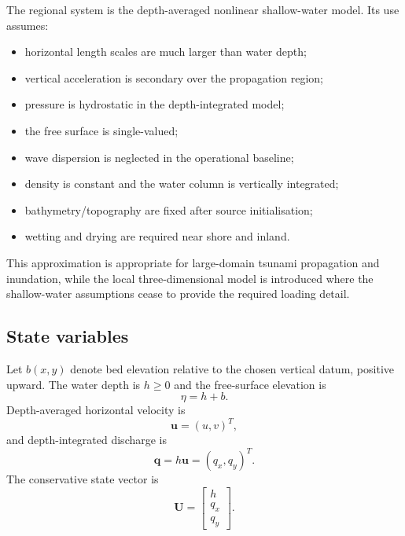 \documentclass[11pt,a4paper]{article}
\newcommand{\vect}[1]{\bm{#1}}
\begin{document}
The regional system is the depth-averaged nonlinear shallow-water model. Its use assumes:
\begin{itemize}
  \item horizontal length scales are much larger than water depth;
  \item vertical acceleration is secondary over the propagation region;
  \item pressure is hydrostatic in the depth-integrated model;
  \item the free surface is single-valued;
  \item wave dispersion is neglected in the operational baseline;
  \item density is constant and the water column is vertically integrated;
  \item bathymetry/topography are fixed after source initialisation;
  \item wetting and drying are required near shore and inland.
\end{itemize}

This approximation is appropriate for large-domain tsunami propagation and inundation, while the local three-dimensional model is introduced where the shallow-water assumptions cease to provide the required loading detail.

\subsection{State variables}

Let $b(x,y)$ denote bed elevation relative to the chosen vertical datum, positive upward. The water depth is $h\ge0$ and the free-surface elevation is
\begin{equation}
  \eta=h+b.
\end{equation}
Depth-averaged horizontal velocity is
\begin{equation}
  \vect u=(u,v)^T,
\end{equation}
and depth-integrated discharge is
\begin{equation}
  \vect q=h\vect u=(q_x,q_y)^T.
\end{equation}
The conservative state vector is
\begin{equation}
  \vect U=
  \begin{bmatrix}
  h\\ q_x\\ q_y
  \end{bmatrix}.
\end{equation}
\end{document}
